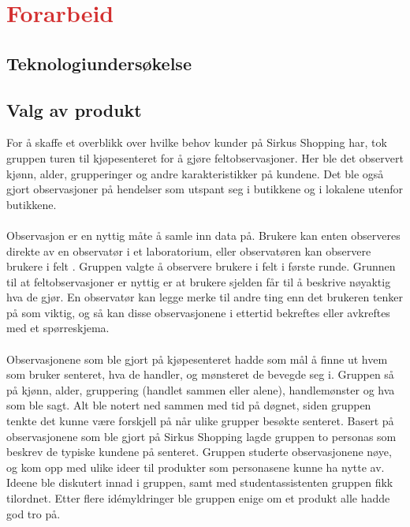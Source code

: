 \section{\textcolor[HTML]{D32F2F}{Forarbeid}}

\subsection{Teknologiundersøkelse}

\subsection{Valg av produkt}
For å skaffe et overblikk over hvilke behov kunder på Sirkus Shopping har, tok gruppen turen til kjøpesenteret for å gjøre feltobservasjoner. Her ble det observert kjønn, alder, grupperinger og andre karakteristikker på kundene. Det ble også gjort observasjoner på hendelser som utspant seg i butikkene og i lokalene utenfor butikkene. 
\\\\
Observasjon er en nyttig måte å samle inn data på. Brukere kan enten observeres direkte av en observatør i et laboratorium, eller observatøren kan observere brukere i felt \cite[s.~253]{preece}. Gruppen valgte å observere brukere i felt i første runde. Grunnen til at feltobservasjoner er nyttig er at brukere sjelden får til å beskrive nøyaktig hva de gjør. En observatør kan legge merke til andre ting enn det brukeren tenker på som viktig, og så kan disse observasjonene i ettertid bekreftes eller avkreftes med et spørreskjema. 
\\\\
Observasjonene som ble gjort på kjøpesenteret hadde som mål å finne ut hvem som bruker senteret, hva de handler, og mønsteret de bevegde seg i. Gruppen så på kjønn, alder, gruppering (handlet sammen eller alene), handlemønster og hva som ble sagt. Alt ble notert ned sammen med tid på døgnet, siden gruppen tenkte det kunne være forskjell på når ulike grupper besøkte senteret.
Basert på observasjonene som ble gjort på Sirkus Shopping lagde gruppen to personas som beskrev de typiske kundene på senteret. Gruppen studerte observasjonene nøye, og kom opp med ulike ideer til produkter som personasene kunne ha nytte av. Ideene ble diskutert innad i gruppen, samt med studentassistenten gruppen fikk tilordnet. Etter flere idémyldringer ble gruppen enige om et produkt alle hadde god tro på. 

